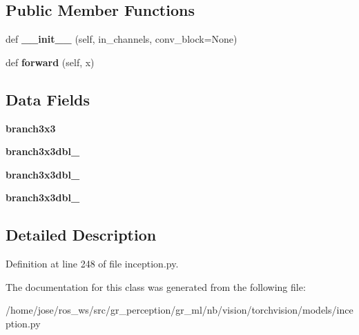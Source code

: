 \subsection*{Public Member Functions}
\begin{DoxyCompactItemize}
\item 
\mbox{\label{classtorchvision_1_1models_1_1inception_1_1InceptionB_a4438ca417e461a93ed3f5142ccea3b57}} 
def {\bfseries \+\_\+\+\_\+init\+\_\+\+\_\+} (self, in\+\_\+channels, conv\+\_\+block=None)
\item 
\mbox{\label{classtorchvision_1_1models_1_1inception_1_1InceptionB_a0760118436a4327ac9c934d10c4cf925}} 
def {\bfseries forward} (self, x)
\end{DoxyCompactItemize}
\subsection*{Data Fields}
\begin{DoxyCompactItemize}
\item 
\mbox{\label{classtorchvision_1_1models_1_1inception_1_1InceptionB_a6fef22df090bbcdecf1aada574373b23}} 
{\bfseries branch3x3}
\item 
\mbox{\label{classtorchvision_1_1models_1_1inception_1_1InceptionB_ab5c51abad9e082a60857e64fdb8297f6}} 
{\bfseries branch3x3dbl\+\_}
\item 
\mbox{\label{classtorchvision_1_1models_1_1inception_1_1InceptionB_afa7da8d55176c15c330ae7c3292a094a}} 
{\bfseries branch3x3dbl\+\_}
\item 
\mbox{\label{classtorchvision_1_1models_1_1inception_1_1InceptionB_acca394170db959553b29ce5d41a15078}} 
{\bfseries branch3x3dbl\+\_}
\end{DoxyCompactItemize}


\subsection{Detailed Description}


Definition at line 248 of file inception.\+py.



The documentation for this class was generated from the following file\+:\begin{DoxyCompactItemize}
\item 
/home/jose/ros\+\_\+ws/src/gr\+\_\+perception/gr\+\_\+ml/nb/vision/torchvision/models/inception.\+py\end{DoxyCompactItemize}
